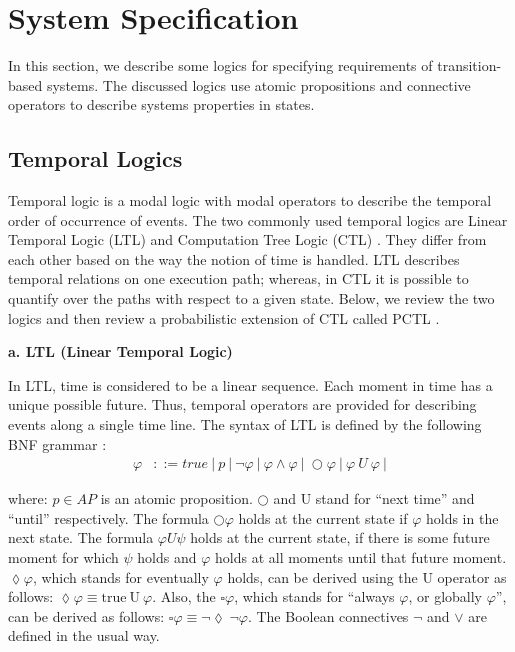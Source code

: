 \section{System Specification} \label{sec:sys-spec-cha2}
In this section, we describe some logics for specifying requirements of transition-based systems. The discussed logics use atomic propositions and connective operators to describe systems properties in states.

\subsection{Temporal Logics}
Temporal logic is a modal logic with modal operators to describe the temporal order of occurrence of events. The two commonly used temporal logics are Linear Temporal Logic (LTL) \cite{Pnueli1977} and Computation Tree Logic (CTL) \cite{Emerson1990}. They differ from each other based on the way the notion of time is handled. LTL describes temporal relations on one execution path; whereas, in CTL it is possible to quantify over the paths with respect to a given state. Below, we review the two logics and then review a probabilistic extension of CTL called PCTL \cite{Hansson1994}.



\noindent \textbf{a. LTL (Linear Temporal Logic)}

In LTL, time is considered to be a linear sequence. Each moment in time has a unique possible future. Thus, temporal operators are provided for describing events along a single time line. The syntax of LTL is defined by the following BNF grammar \cite{Baier2008}:
%
\begin{align*}
    \varphi & ::= true ~|~p~|~\neg \varphi~|~\varphi \wedge \varphi~|~ \bigcirc \varphi ~ | ~ \varphi ~U~ \varphi~|
\end{align*}

\noindent where: $p\in AP$ is an atomic proposition. $\bigcirc$ and $\mathrm{U}$ stand for ``next time'' and ``until'' respectively. The formula $\bigcirc \varphi$  holds at the current state if $\varphi$ holds in the next state. The formula $\varphi U \psi$ holds at the current state, if there is some future moment for which $\psi$ holds and $\varphi$ holds at all moments until that future moment. $\lozenge \varphi$, which stands for eventually $\varphi$ holds, can be derived using the $\mathrm{U}$ operator as follows: $\lozenge \varphi \equiv \mathrm{true}~ \mathrm{U}~ \varphi$. Also, the $\square \varphi$, which stands for ``always $\varphi$, or  globally $\varphi$'', can be derived as follows: $\square \varphi \equiv \neg\lozenge~ \neg\varphi$. The Boolean connectives $\neg$ and $\vee$ are defined in the usual way.


